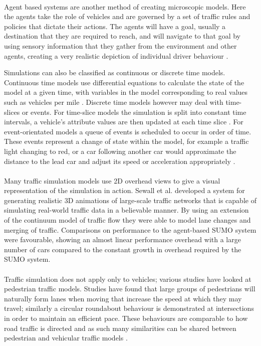 \paragraph{}
Agent based systems are another method of creating microscopic models. Here the agents take the role of vehicles and are governed by a set of traffic rules and policies that dictate their actions. The agents will have a goal, usually a destination that they are required to reach, and will navigate to that goal by using sensory information that they gather from the environment and other agents, creating a very realistic depiction of individual driver behaviour \cite{948773,4621183}.

\pagebreak
Simulations can also be classified as continuous or discrete time models.
Continuous time models use differential equations to calculate the state of the model at a given time, with variables in the model corresponding to real values such as vehicles per mile \cite{Lighthill1955Kinetic}.
Discrete time models however may deal with time-slices or events. For time-slice models the simulation is split into constant time intervals, a vehicle's attribute values are then updated at each time slice \cite{Schulze:1997:UTS:268437.268764}. For event-orientated models a queue of events is scheduled to occur in order of time. These events represent a change of state within the model, for example a traffic light changing to red, or a car following another car would approximate the distance to the lead car and adjust its speed or acceleration appropriately \cite{Schulze:1997:UTS:268437.268764,algers1997review}.

\paragraph{}
Many traffic simulation models use 2D overhead views to give a visual representation of the simulation in action. Sewall et al. \cite{sewall2010continuum} developed a system for generating realistic 3D animations of large-scale traffic networks that is capable of simulating real-world traffic data in a believable manner. By using an extension of the continuum model of traffic flow they were able to model lane changes and merging of traffic. Comparisons on performance to the agent-based SUMO \cite{SUMO} system were favourable, showing an almost linear performance overhead with a large number of cars compared to the constant growth in overhead required by the SUMO system.

\paragraph{}
Traffic simulation does not apply only to vehicles; various studies have looked at pedestrian traffic models. Studies have found that large groups of pedestrians will naturally form lanes when moving that increase the speed at which they may travel; similarly a circular roundabout behaviour is demonstrated at intersections in order to maintain an efficient pace. These behaviours are comparable to how road traffic is directed and as such many similarities can be shared between pedestrian and vehicular traffic models \cite{helbing2001self,lovaas1994modeling,helbing2001traffic}.

